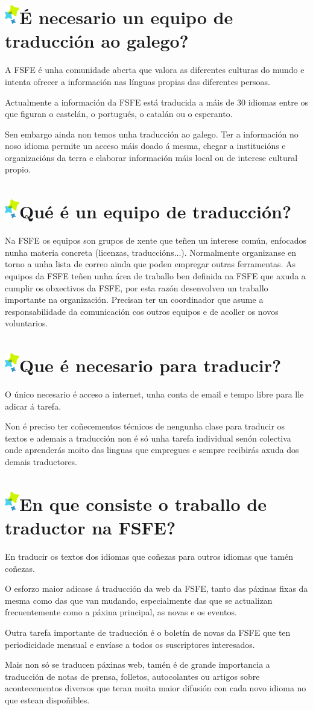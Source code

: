 \documentclass[10pt,foldmark,tumble]{leaflet}
\newcommand{\tit}[1]{\section{\protect\includegraphics{item.png}#1}}
\begin{document}
\tit{É necesario un equipo de traducción ao galego?}
A FSFE é unha comunidade aberta que valora as diferentes culturas do mundo e intenta ofrecer a información nas línguas propias das diferentes persoas.

Actualmente a información da FSFE está traducida a máis de 30 idiomas entre os que figuran o castelán, o portugués, o catalán ou o esperanto.

Sen embargo ainda non temos unha traducción ao galego. Ter a información no noso idioma permite un acceso máis doado á mesma, chegar a institucións e organizacións da terra e elaborar información máis local ou de interese cultural propio.

\tit{Qué é un equipo de traducción?}

 Na FSFE os equipos son grupos de xente que teñen un interese común, enfocados nunha materia concreta (licenzas, traduccións...). Normalmente organizanse en torno a unha lista de correo ainda que poden empregar outras ferramentas. As equipos da FSFE teñen unha área de traballo ben definida na FSFE que axuda a cumplir os obxectivos da FSFE, por esta razón desenvolven un traballo importante na organización. Precisan ter un coordinador que asume a responsabilidade da comunicación cos outros equipos e de acoller os novos voluntarios.
 
\tit{Que é necesario para traducir?}

O único necesario é acceso a internet, unha conta de email e tempo libre para lle adicar á tarefa.

Non é preciso ter coñecementos técnicos de nengunha clase para traducir os textos e ademais a traducción non é só unha tarefa individual senón colectiva onde aprenderás moito das linguas que empregues e sempre recibirás axuda dos demais traductores.

\tit{En que consiste o traballo de traductor na FSFE?}

En traducir os textos dos idiomas que coñezas para outros idiomas que tamén coñezas. 

O esforzo maior adicase á traducción da web da FSFE, tanto das páxinas fixas da mesma como das que van mudando, especialmente das que se actualizan frecuentemente como a páxina principal, as novas e os eventos. 

Outra tarefa importante de traducción é o boletín de novas da FSFE que ten periodicidade mensual e envíase a todos os suscriptores interesados.

Mais non só se traducen páxinas web, tamén é de grande importancia a traducción de notas de prensa, folletos, autocolantes ou artigos sobre acontecementos diversos que teran moita maior difusión con cada novo idioma no que estean dispoñibles.
\end{document}
